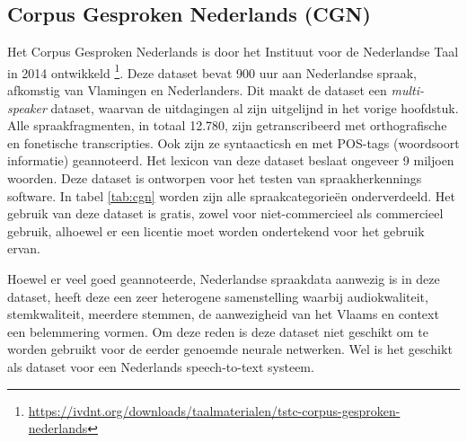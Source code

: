 \subsection{Corpus Gesproken Nederlands (CGN)}
Het Corpus Gesproken Nederlands is door het Instituut voor de Nederlandse Taal in 2014 ontwikkeld \footnote{\url{https://ivdnt.org/downloads/taalmaterialen/tstc-corpus-gesproken-nederlands}}. Deze dataset bevat 900 uur aan Nederlandse spraak, afkomstig van Vlamingen en Nederlanders. Dit maakt de dataset een \textit{multi-speaker} dataset, waarvan de uitdagingen al zijn uitgelijnd in het vorige hoofdstuk. Alle spraakfragmenten, in totaal 12.780, zijn getranscribeerd met orthografische en fonetische transcripties. Ook zijn ze syntaacticsh en met POS-tags (woordsoort informatie) geannoteerd. Het lexicon van deze dataset beslaat ongeveer 9 miljoen woorden. Deze dataset is ontworpen voor het testen van spraakherkennings software. In tabel \ref{tab:cgn} worden zijn alle spraakcategorieën onderverdeeld. Het gebruik van deze dataset is gratis, zowel voor niet-commercieel als commercieel gebruik, alhoewel er een licentie moet worden ondertekend voor het gebruik ervan.

Hoewel er veel goed geannoteerde, Nederlandse spraakdata aanwezig is in deze dataset, heeft deze een zeer heterogene samenstelling waarbij audiokwaliteit, stemkwaliteit, meerdere stemmen, de aanwezigheid van het Vlaams en context een belemmering vormen. Om deze reden is deze dataset niet geschikt om te worden gebruikt voor de eerder genoemde neurale netwerken. Wel is het geschikt als dataset voor een Nederlands speech-to-text systeem.

